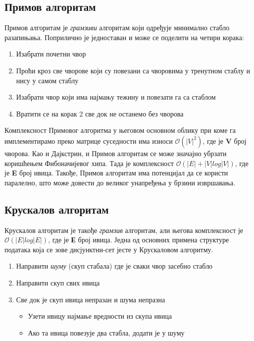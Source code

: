 \documentclass[11pt, oneside, a4paper]{article}
\begin{document}
\subsection{Примов алгоритам}
Примов алгоритам је \textit{грамзиви} алгоритам који одређује минимално стабло разапињања. Поприлично је једноставан и може се поделити на четири корака: 
\begin{enumerate}
    \item Изабрати почетни чвор
    \item Проћи кроз све чворове који су повезани са чворовима у тренутном стаблу и нису у самом стаблу
    \item Изабрати чвор који има најмању тежину и повезати га са стаблом
    \item Вратити се на корак 2 све док не останемо без чворова
\end{enumerate}
Комплексност Примовог алгоритма у његовом основном облику при коме га имплементирамо преко матрице суседности има износи $\mathcal{O}(|V|^2)$, где је \textbf{V} број чворова. Као и Дајкстрин, и Примов алгоритам се може значајно убрзати коришћењем Фибоначијевог хипа. Тада је комплексност $\mathcal{O}(|E| + |V|log|V|)$, где је \textbf{E} број ивица. Такође, Примов алгоритам има потенцијал да се користи паралелно, што може довести до великог унапређења у брзини извршавања. 
\subsection{Крускалов алгоритам}
Крускалов алгоритам је такође \textit{грамзив} алгоритам, али његова комплексност је $\mathcal{O}(|E| log|E|)$, где је \textbf{Е} број ивица.
Једна од основних примена структуре података која се зове дисјунктни-сет јесте у Крускаловом алгоритму. 
\begin{enumerate}
    \item Направити \textit{шуму} (скуп стабала) где је сваки чвор засебно стабло
    \item Направити скуп свих ивица
    \item Све док је скуп ивица непразан и шума непразна
    \begin{itemize}
        \item Узети ивицу најмање вредности из скупа ивица
        \item Ако та ивица повезује два стабла, додати је у шуму
    \end{itemize}
    
\end{enumerate}
\end{document}
